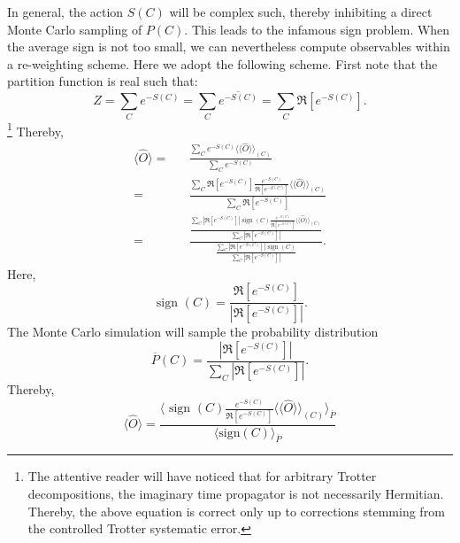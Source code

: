 In general, the action  $S(C) $ will be complex such, thereby inhibiting a direct Monte Carlo sampling of $P(C)$.   This leads to the infamous sign problem.  When the average sign is not too small, we can nevertheless  compute observables within a re-weighting scheme.   Here we adopt the following scheme. First  note  that the partition function is real such that: 
\begin{equation}
	Z =   \sum_{C}  e^{-S(C)}    =  \sum_{C}  \overline{e^{-S(C)}} = \sum_{C}  \Re \left[e^{-S(C)} \right]. 
\end{equation}
\footnote{The attentive reader will have noticed that   for arbitrary Trotter decompositions,  the  imaginary time propagator is not necessarily Hermitian. Thereby, the above equation is correct only up to corrections stemming from the  controlled Trotter systematic error. }
Thereby,  
\begin{eqnarray}
\langle \hat{O}  \rangle  = & &  \frac{\sum_{C}  e^{-S(C)} \langle \langle \hat{O}  \rangle \rangle_{(C)} }{\sum_{C}  e^{-S(C)}}       \nonumber \\ 
                          =  & &  \frac{\sum_{C}   \Re \left[e^{-S(C)} \right]    \frac{e^{-S(C)}} {\Re \left[e^{-S(C)} \right]}  \langle \langle \hat{O}  \rangle \rangle_{(C)} }{\sum_{C}   \Re \left[e^{-S(C)} \right]}    \nonumber \\ 
          = & & 
   \frac{  \frac{ \sum_{C}  \left| \Re \left[e^{-S(C)} \right]  \right|   \text{ sign }(C)   \frac{e^{-S(C)}} {\Re \left[e^{-S(C)} \right]}  \langle \langle \hat{O}  \rangle \rangle_{(C)}  }
       {  \sum_{C}  \left| \Re \left[ e^{-S(C)} \right] \right|  }     }   {  \frac { \sum_{C}  \left|  \Re \left[ e^{-S(C)} \right]   \right|   \text{ sign }(C) }  {  \sum_{C}   \left| \Re \left[ e^{-S(C)} \right] \right|  }  } . 
\end{eqnarray} 
Here,
\begin{equation}
\label{Sign.eq}
	 \text{ sign }(C)   =  \frac{   \Re \left[e^{-S(C)} \right]  } {\left| \Re \left[e^{-S(C)} \right]  \right|  }.
\end{equation}
The Monte Carlo simulation will sample the probability distribution 
\begin{equation}  
	 \overline{P}(C) = \frac{ \left|  \Re \left[ e^{-S(C)} \right] \right| }{\sum_C \left|  \Re \left[ e^{-S(C)} \right]  \right| }.
\end{equation}
Thereby, 
\begin{equation}
	\langle \hat{O}  \rangle  = \frac{   \langle  \text{ sign }(C)   \frac{e^{-S(C)}} {\Re \left[e^{-S(C)} \right]}  \langle \langle \hat{O}  \rangle \rangle_{(C)}  \rangle_{\overline{P}} } { \langle \text{sign} (C)   \rangle_{\overline{P}}}
\end{equation}
